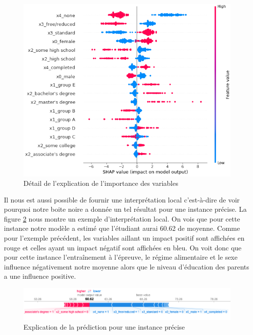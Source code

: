 \begin{figure}[h]
    \includegraphics[scale=0.6]{src_img/shapPlotDetail.png}
    \caption{Détail de l'explication de l'importance des variables}
    \label{shapPlotDetail}
\end{figure}
Il nous est aussi possible de fournir une interprétation local c'est-à-dire de voir pourquoi notre boite noire a donnée un tel résultat pour une instance précise. La figure \ref{shapPlotLocal} nous montre un exemple d'interprétation local. On vois que pour cette instance notre modèle a estimé que l'étudiant aurai 60.62 de moyenne. Comme pour l'exemple précédent, les variables aillant un impact positif sont affichées en rouge et celles ayant un impact négatif sont affichées en bleu. On voit donc que pour cette instance l'entraînement à l'épreuve, le régime alimentaire et le sexe influence négativement notre moyenne alors que le niveau d’éducation des parents a une influence positive.
\begin{figure}[h]
    \includegraphics[scale=0.5]{src_img/shapPlotLocal.png}
    \caption{Explication de la prédiction pour une instance précise}
    \label{shapPlotLocal}
\end{figure}

